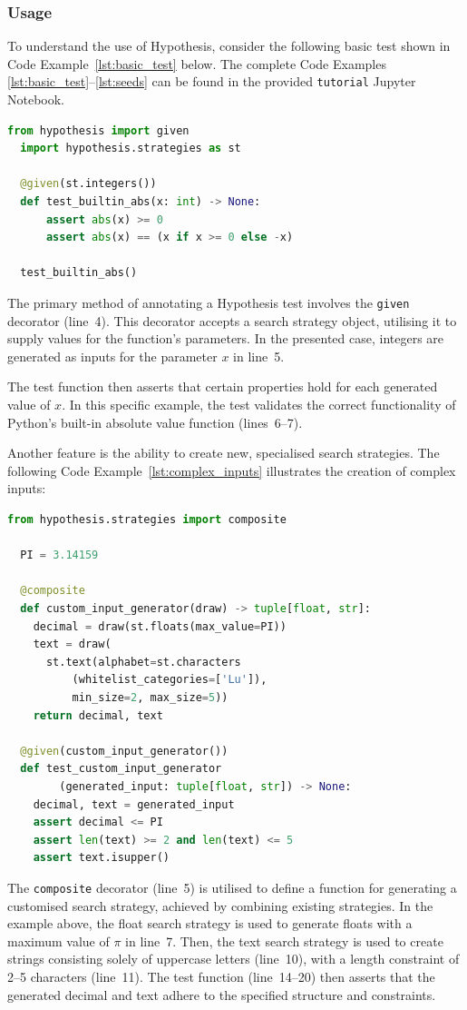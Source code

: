 \documentclass[runningheads]{llncs}
\begin{document}
\subsubsection{Usage}
To understand the use of Hypothesis, consider the following basic test shown in Code Example~\ref{lst:basic_test} below. The complete Code Examples \ref{lst:basic_test}--\ref{lst:seeds} can be found in the provided \texttt{tutorial} Jupyter Notebook.
\begin{lstlisting}[language=Python,caption={Basic Test from \texttt{tutorial.ipynb}},label=lst:basic_test]
  from hypothesis import given
  import hypothesis.strategies as st

  @given(st.integers())
  def test_builtin_abs(x: int) -> None:
      assert abs(x) >= 0
      assert abs(x) == (x if x >= 0 else -x)

  test_builtin_abs()
\end{lstlisting}
The primary method of annotating a Hypothesis test involves the \texttt{given} decorator (line~4). This decorator accepts a search strategy object, utilising it to supply values for the function's parameters. In the presented case, integers are generated as inputs for the parameter $x$ in line~5.

The test function then asserts that certain properties hold for each generated value of $x$. In this specific example, the test validates the correct functionality of Python's built-in absolute value function (lines~6--7).

\vspace{5mm}
\noindent Another feature is the ability to create new, specialised search strategies. The following Code Example~\ref{lst:complex_inputs} illustrates the creation of complex inputs:

\begin{lstlisting}[language=Python,caption={Complex Inputs from \texttt{tutorial.ipynb}},label=lst:complex_inputs]
  from hypothesis.strategies import composite

  PI = 3.14159

  @composite
  def custom_input_generator(draw) -> tuple[float, str]:
    decimal = draw(st.floats(max_value=PI))
    text = draw(
      st.text(alphabet=st.characters
          (whitelist_categories=['Lu']),
          min_size=2, max_size=5))
    return decimal, text

  @given(custom_input_generator())
  def test_custom_input_generator
        (generated_input: tuple[float, str]) -> None:
    decimal, text = generated_input
    assert decimal <= PI
    assert len(text) >= 2 and len(text) <= 5
    assert text.isupper()
\end{lstlisting}
The \texttt{composite} decorator (line~5) is utilised to define a function for generating a customised search strategy, achieved by combining existing strategies. In the example above, the float search strategy is used to generate floats with a maximum value of $\pi$ in line~7. Then, the text search strategy is used to create strings consisting solely of uppercase letters (line~10), with a length constraint of 2--5 characters (line~11). The test function (line~14--20) then asserts that the generated decimal and text adhere to the specified structure and constraints.
\end{document}
